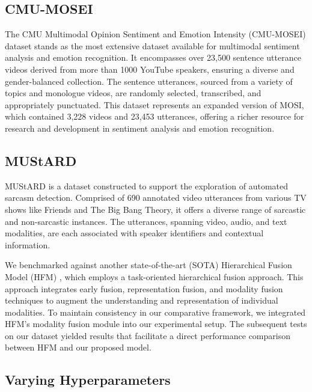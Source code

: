 \documentclass{article} %
\begin{document}
\subsection{CMU-MOSEI}
\label{apsec: MOSEI1}



The CMU Multimodal Opinion Sentiment and Emotion Intensity (CMU-MOSEI) dataset stands as the most extensive dataset available for multimodal sentiment analysis and emotion recognition. It encompasses over 23,500 sentence utterance videos derived from more than 1000 YouTube speakers, ensuring a diverse and gender-balanced collection. The sentence utterances, sourced from a variety of topics and monologue videos, are randomly selected, transcribed, and appropriately punctuated. This dataset represents an expanded version of MOSI, which contained 3,228 videos and 23,453 utterances, offering a richer resource for research and development in sentiment analysis and emotion recognition.

\subsection{MUStARD}

MUStARD is a dataset constructed to support the exploration of automated sarcasm detection. Comprised of 690 annotated video utterances from various TV shows like Friends and The Big Bang Theory, it offers a diverse range of sarcastic and non-sarcastic instances. The utterances, spanning video, audio, and text modalities, are each associated with speaker identifiers and contextual information.


We benchmarked against another state-of-the-art (SOTA) Hierarchical Fusion Model (HFM) \citep{cai2019multi}, which employs a task-oriented hierarchical fusion approach. This approach integrates early fusion, representation fusion, and modality fusion techniques to augment the understanding and representation of individual modalities. To maintain consistency in our comparative framework, we integrated HFM's modality fusion module into our experimental setup. The subsequent tests on our dataset yielded results that facilitate a direct performance comparison between HFM and our proposed model.




\subsection{Varying Hyperparameters}
\end{document}
